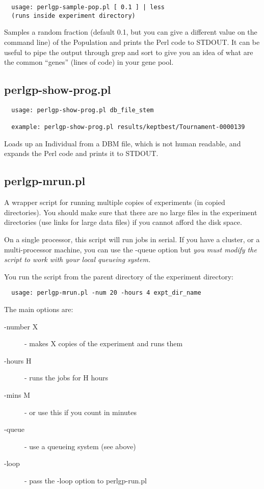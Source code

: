 \documentclass[a4paper]{article}
\begin{document}
\begin{verbatim}
  usage: perlgp-sample-pop.pl [ 0.1 ] | less
  (runs inside experiment directory)
\end{verbatim}

Samples a random fraction (default 0.1, but you can give a different
value on the command line) of the Population and prints the Perl code
to STDOUT.  It can be useful to pipe the output through grep and sort
to give you an idea of what are the common ``genes'' (lines of code)
in your gene pool.

\subsection{perlgp-show-prog.pl}

\begin{verbatim}
  usage: perlgp-show-prog.pl db_file_stem

  example: perlgp-show-prog.pl results/keptbest/Tournament-0000139
\end{verbatim}

Loads up an Individual from a DBM file, which is not human readable,
and expands the Perl code and prints it to STDOUT.

\subsection{perlgp-mrun.pl}

A wrapper script for running multiple copies of experiments (in copied
directories).  You should make sure that there are no large files in
the experiment directories (use links for large data files) if you
cannot afford the disk space.

On a single processor, this script will run jobs in serial.  If you
have a cluster, or a multi-processor machine, you can use the -queue
option but \textit{you must modify the script to work with your local
queueing system.}

You run the script from the parent directory of the experiment directory:

\begin{verbatim}
  usage: perlgp-mrun.pl -num 20 -hours 4 expt_dir_name
\end{verbatim}

The main options are:
\begin{description}
\item[-number X] - makes X copies of the experiment and runs them
\item[-hours H] - runs the jobs for H hours
\item[-mins M] - or use this if you count in minutes
\item[-queue] - use a queueing system (see above)
\item[-loop] - pass the -loop option to perlgp-run.pl
\end{description}
\end{document}
